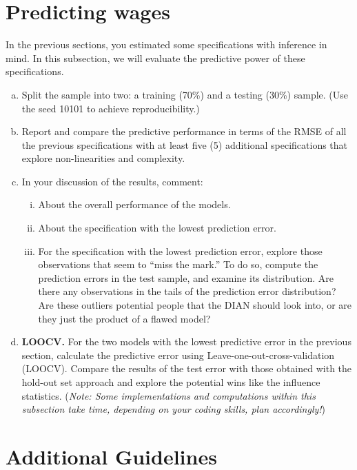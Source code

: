 \documentclass[12pt,a4paper,onecolumn]{article}
\begin{document}
\section{Predicting wages}

In the previous sections, you estimated some specifications with inference in mind. In this subsection, we will evaluate the predictive power of these specifications.

\begin{enumerate}[(a)]
  \item Split the sample into two: a training (70\%) and a testing (30\%) sample. (Use the seed 10101 to achieve reproducibility.)
  \item Report and compare the predictive performance in terms of the RMSE of all the previous specifications with at least five (5) additional specifications that explore non-linearities and complexity.
  \item In your discussion of the results, comment:
  \begin{enumerate}[i.]
    \item About the overall performance of the models.
    \item About the specification with the lowest prediction error.
    \item For the specification with the lowest prediction error, explore those observations that seem to ``miss the mark.'' To do so, compute the prediction errors in the test sample, and examine its distribution. Are there any observations in the tails of the prediction error distribution? Are these outliers potential people that the DIAN should look into, or are they just the product of a flawed model?
  \end{enumerate}
  \item \textbf{LOOCV.} For the two models with the lowest predictive error in the previous section, calculate the predictive error using Leave-one-out-cross-validation (LOOCV). Compare the results of the test error with those obtained with the hold-out set approach and explore the potential wins like the influence statistics. (\textit{Note: Some implementations and computations within this subsection take time, depending on your coding skills, plan accordingly!})
\end{enumerate}

\section{Additional Guidelines}
\end{document}
